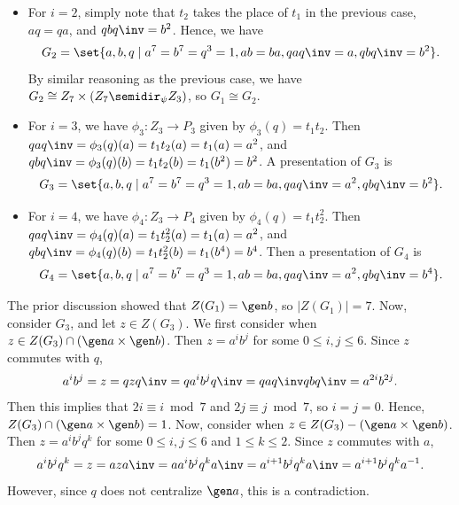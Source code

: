 \begin{solenum}[spsol]
\begin{itemize}
        If we consider a homomorphism $\psi : Z_3 \to \aut(Z_7)$, then $q \mapsto \alpha$ or $q \mapsto \alpha^2$ such that $\alpha$ generates the unique subgroup of order 3 in $\aut(Z_7)$.
        In either case, we have $\gen{a, q} \cong Z_7 \semidir_\psi Z_3$ as it satisfies the relations $qaq\inv = a^2$ in the na\"ive presentation.
        Hence, we have
        \[
        	G_1 \cong Z_7 \times (Z_7 \semidir_\psi Z_3).
        \]
        \item For $i = 2$, simply note that $t_2$ takes the place of $t_1$ in the previous case, $aq = qa$, and $qbq\inv = b^2$.
	    Hence, we have
        \[
        	G_2 = \set{a, b, q \mid a^7 = b^7 = q^3 = 1, ab = ba, qaq\inv = a, qbq\inv = b^2}.
        \]
        By similar reasoning as the previous case, we have $G_2 \cong Z_7 \times (Z_7 \semidir_\psi Z_3)$, so $G_1 \cong G_2$.
        \item For $i = 3$, we have $\phi_3 : Z_3 \to P_3$ given by $\phi_3(q) = t_1t_2$.
        Then $qaq\inv = \phi_3(q)(a) = t_1t_2(a) = t_1(a) = a^2$, and $qbq\inv = \phi_3(q)(b) = t_1t_2(b) = t_1(b^2) = b^2$.
        A presentation of $G_3$ is
        \[
        	G_3 = \set{a, b, q \mid a^7 = b^7 = q^3 = 1, ab = ba, qaq\inv = a^2, qbq\inv = b^2}.
        \]
        \item For $i = 4$, we have $\phi_4 : Z_3 \to P_4$ given by $\phi_4(q) = t_1t_2^2$.
        Then $qaq\inv = \phi_4(q)(a) = t_1t_2^2(a) = t_1(a) = a^2$, and $qbq\inv = \phi_4(q)(b) = t_1t_2^2(b) = t_1(b^4) = b^4$.
        Then a presentation of $G_4$ is
        \[
        	G_4 = \set{a, b, q \mid a^7 = b^7 = q^3 = 1, ab = ba, qaq\inv = a^2, qbq\inv = b^4}.
        \]
    \end{itemize}
    \item The prior discussion showed that $Z(G_1) = \gen b$, so $|Z(G_1)| = 7$.
	Now, consider $G_3$, and let $z \in Z(G_3)$.
	We first consider when $z \in Z(G_3) \cap (\gen a \times \gen b)$.
	Then $z = a^ib^j$ for some $0 \leq i, j \leq 6$.
	Since $z$ commutes with $q$, 
    \[
    	a^ib^j = z = qzq\inv = qa^ib^jq\inv = qaq\inv qbq\inv = a^{2i}b^{2j}.
    \]
    Then this implies that $2i \equiv i \bmod 7$ and $2j \equiv j \bmod 7$, so $i = j =0$.
	Hence, $Z(G_3) \cap (\gen a \times \gen b) = 1$.
	Now, consider when $z \in Z(G_3) - (\gen a \times \gen b)$.
	Then $z = a^ib^jq^k$ for some $0 \leq i, j \leq 6$ and $1 \leq k \leq 2$.
	Since $z$ commutes with $a$, 
    \[
    	a^ib^jq^k = z = aza\inv = aa^ib^jq^ka\inv = a^{i+1}b^jq^ka\inv = a^{i+1}b^jq^ka^{-1}.
    \]
    However, since $q$ does not centralize $\gen a$, this is a contradiction.

\end{solenum}
